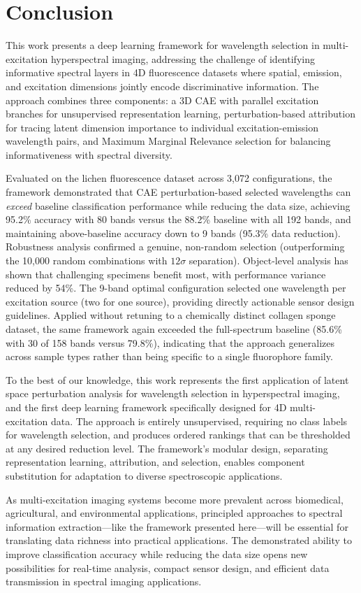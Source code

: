 \section{Conclusion}
\label{sec:conclusion}

This work presents a deep learning framework for wavelength selection in multi-excitation hyperspectral imaging, addressing the challenge of identifying informative spectral layers in 4D fluorescence datasets where spatial, emission, and excitation dimensions jointly encode discriminative information.
The approach combines three components: a 3D CAE with parallel excitation branches for unsupervised representation learning, perturbation-based attribution for tracing latent dimension importance to individual excitation-emission wavelength pairs, and Maximum Marginal Relevance selection for balancing informativeness with spectral diversity.

Evaluated on the lichen fluorescence dataset across 3,072 configurations, the framework demonstrated that CAE perturbation-based selected wavelengths can \emph{exceed} baseline classification performance while reducing the data size, achieving 95.2\% accuracy with 80 bands versus the 88.2\% baseline with all 192 bands, and maintaining above-baseline accuracy down to 9 bands (95.3\% data reduction).
Robustness analysis confirmed a genuine, non-random selection (outperforming the 10,000 random combinations with $12\sigma$ separation). Object-level analysis has shown that challenging specimens benefit most, with performance variance reduced by 54\%.
The 9-band optimal configuration selected one wavelength per excitation source (two for one source), providing directly actionable sensor design guidelines.
Applied without retuning to a chemically distinct collagen sponge dataset, the same framework again exceeded the full-spectrum baseline (85.6\% with 30 of 158 bands versus 79.8\%), indicating that the approach generalizes across sample types rather than being specific to a single fluorophore family.

To the best of our knowledge, this work represents the first application of latent space perturbation analysis for wavelength selection in hyperspectral imaging, and the first deep learning framework specifically designed for 4D multi-excitation data.
The approach is entirely unsupervised, requiring no class labels for wavelength selection, and produces ordered rankings that can be thresholded at any desired reduction level.
The framework's modular design, separating representation learning, attribution, and selection, enables component substitution for adaptation to diverse spectroscopic applications.

As multi-excitation imaging systems become more prevalent across biomedical, agricultural, and environmental applications, principled approaches to spectral information extraction---like the framework presented here---will be essential for translating data richness into practical applications.
The demonstrated ability to improve classification accuracy while reducing the data size opens new possibilities for real-time analysis, compact sensor design, and efficient data transmission in spectral imaging applications.